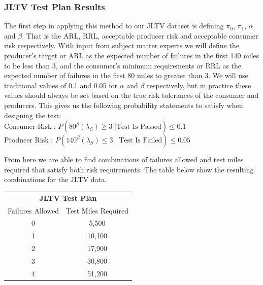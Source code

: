 \documentclass[12pt]{article}
\begin{document}
\subsubsection{JLTV Test Plan Results}
The first step in applying this method to our JLTV dataset is defining $\pi_0$,
$\pi_1$, $\alpha$ and $\beta$.  That is the ARL, RRL, acceptable producer risk
and acceptable consumer risk respectively.  With input from subject matter
experts  we will define the producer's target or ARL as the expected number of
failures in the first 140 miles to be less  than 3, and the consumer's minimum
requirements or RRL as the expected number of failures in  the first 80 miles to
greater than 3.  We will use traditional values of 0.1 and 0.05 for $\alpha$ and
$\beta$ respectively, but in practice these values should always be set based on
the true risk tolerances of the consumer and producers.  This gives us the
following probability statements to satisfy when designing the test:
\\
Consumer Risk : $ P(80^\beta (\lambda_S) \geq 3 \; \vert \text{Test Is Passed}) \leq 0.1 $ \\
Producer Risk : $ P(140^\beta (\lambda_S) \leq 3 \; \vert \; \text{Test Is Failed}) \leq 0.05 $

From here we are able to find combinations of failures allowed and test miles
required that satisfy both risk requirements.  The table below show the
resulting combinations for the JLTV data.

\begin{table}[h]
\center
\begin{tabular}{|c|c|}
\multicolumn{2}{c}{\textbf{JLTV Test Plan}} \\
\cline{1-2}
Failures Allowed    & Test Miles Required \\
\hline
0   & 5,500     \\
1   & 10,100    \\
2   & 17,900    \\
3   & 30,800    \\
4   & 51,200    \\
\hline
\end{tabular}
\end{table}
\end{document}
